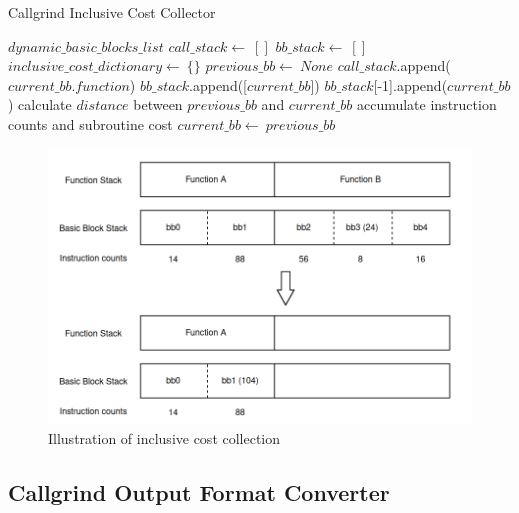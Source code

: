 \medskip
\begin{algorithm}
\caption{Callgrind Inclusive Cost Collector}
\label{alg:inclusive_cost_collector}
\begin{algorithmic}
\REQUIRE $dynamic\_basic\_blocks\_list$
\STATE $call\_stack \gets\ []$
\STATE $bb\_stack \gets\ []$
\STATE $inclusive\_cost\_dictionary \gets\ \{\}$
\STATE $previous\_bb \gets\ None$
        \STATE $call\_stack$.append($current\_bb.function$)
        \STATE $bb\_stack$.append([$current\_bb$])
        \STATE $bb\_stack$[-1].append($current\_bb$)
        \STATE calculate $distance$ between $previous\_bb$ and $current\_bb$
            \STATE accumulate instruction counts and subroutine cost
        \ENDFOR
    \ENDIF
    \STATE $current\_bb \gets\ previous\_bb$
\ENDFOR
\end{algorithmic}
\end{algorithm}
\medskip

\begin{figure}
    \centering
    \includegraphics[width=\linewidth]{figures/Analyzer_inclusive_cost.png}
    \caption{Illustration of inclusive cost collection}
    \label{fig:analyzer_inclusive_cost}
\end{figure}
                    
\subsection{Callgrind Output Format Converter}
\label{subsec:converter}

